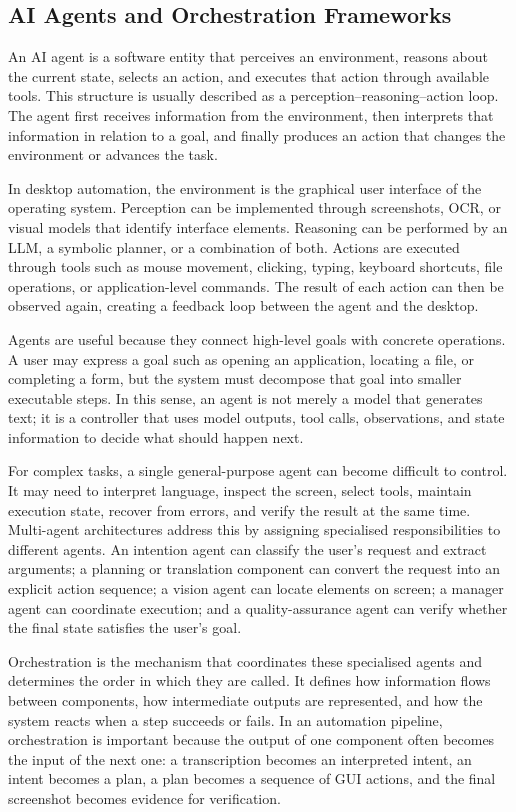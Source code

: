 \subsection{AI Agents and Orchestration Frameworks}
\label{subsec:agents}

An AI agent is a software entity that perceives an environment, reasons about the current state, selects an action, and executes that action through available tools. This structure is usually described as a perception--reasoning--action loop. The agent first receives information from the environment, then interprets that information in relation to a goal, and finally produces an action that changes the environment or advances the task.

In desktop automation, the environment is the graphical user interface of the operating system. Perception can be implemented through screenshots, OCR, or visual models that identify interface elements. Reasoning can be performed by an LLM, a symbolic planner, or a combination of both. Actions are executed through tools such as mouse movement, clicking, typing, keyboard shortcuts, file operations, or application-level commands. The result of each action can then be observed again, creating a feedback loop between the agent and the desktop.

Agents are useful because they connect high-level goals with concrete operations. A user may express a goal such as opening an application, locating a file, or completing a form, but the system must decompose that goal into smaller executable steps. In this sense, an agent is not merely a model that generates text; it is a controller that uses model outputs, tool calls, observations, and state information to decide what should happen next.

For complex tasks, a single general-purpose agent can become difficult to control. It may need to interpret language, inspect the screen, select tools, maintain execution state, recover from errors, and verify the result at the same time. Multi-agent architectures address this by assigning specialised responsibilities to different agents. An intention agent can classify the user's request and extract arguments; a planning or translation component can convert the request into an explicit action sequence; a vision agent can locate elements on screen; a manager agent can coordinate execution; and a quality-assurance agent can verify whether the final state satisfies the user's goal.

Orchestration is the mechanism that coordinates these specialised agents and determines the order in which they are called. It defines how information flows between components, how intermediate outputs are represented, and how the system reacts when a step succeeds or fails. In an automation pipeline, orchestration is important because the output of one component often becomes the input of the next one: a transcription becomes an interpreted intent, an intent becomes a plan, a plan becomes a sequence of GUI actions, and the final screenshot becomes evidence for verification.

